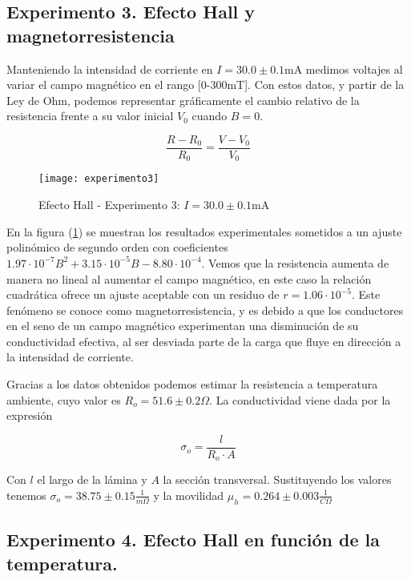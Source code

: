\subsection{Experimento 3. Efecto Hall y magnetorresistencia}

Manteniendo la intensidad de corriente en $I = 30.0 \pm 0.1$mA medimos voltajes al variar el campo magnético en el rango [0-300mT]. Con estos datos, y partir de la Ley de Ohm, podemos representar gráficamente el cambio relativo de la resistencia frente a su valor inicial $V_0$ cuando $B=0$.

\begin{equation}
	\frac{R - R_0}{R_0} = \frac{V - V_0}{V_0}
\end{equation}

\begin{figure}[t]
	\texttt{[image: experimento3]}
	\caption{Efecto Hall - Experimento 3: $I = 30.0 \pm 0.1$mA}
	\label{figure_exp3}
\end{figure}

En la figura (\ref{figure_exp3}) se muestran los resultados experimentales sometidos a un ajuste polinómico de segundo orden con coeficientes $1.97 \cdot 10^{-7} B^2 + 3.15 \cdot 10^{-5} B - 8.80\cdot 10^{-4}$. Vemos que la resistencia aumenta de manera no lineal al aumentar el campo magnético, en este caso la relación cuadrática ofrece un ajuste aceptable con un residuo de $r = 1.06 \cdot 10^{-5}$. Este fenómeno se conoce como magnetorresistencia, y es debido a que los conductores en el seno de un campo magnético experimentan una disminución de su conductividad efectiva, al ser desviada parte de la carga que fluye en dirección a la intensidad de corriente.

Gracias a los datos obtenidos podemos estimar la resistencia a temperatura ambiente, cuyo valor es $R_o = 51.6 \pm 0.2 \Omega$. La conductividad viene dada por la expresión

\begin{equation}
	\sigma_o = \frac{l}{R_o \cdot A}
\end{equation}

Con $l$ el largo de la lámina y $A$ la sección transversal. Sustituyendo los valores tenemos $\sigma_o = 38.75 \pm 0.15 \frac{1}{m\Omega}$ y la movilidad $\mu_h = 0.264 \pm 0.003\frac{1}{C\Omega}$

\subsection{Experimento 4. Efecto Hall en función de la temperatura.}

